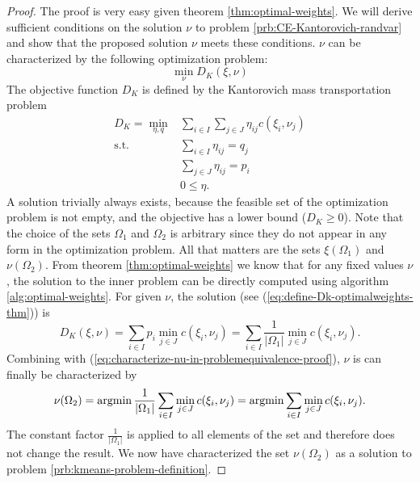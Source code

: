 \begin{proof}
  The proof is very easy given theorem \ref{thm:optimal-weights}. 
  We will derive sufficient conditions on the solution $\nu$ to problem \ref{prb:CE-Kantorovich-randvar} and show that the proposed solution $\nu$ meets these conditions.
  $\nu$ can be characterized by the following optimization problem:
  \begin{equation}
    \label{eq:characterize-nu-in-problemequivalence-proof}
    \min\limits_{\nu}D_K(\xi,\nu)
  \end{equation}
  The objective function $D_K$ is defined by the Kantorovich mass transportation problem
  \begin{align}
    \label{eq:kantoro-in-problemequivalence-proof}
    D_K = \min\limits_{\eta, q}& \sum_{i\in I}\sum_{j\in J}\eta_{ij}c(\xi_i,\nu_j)\\
    \text{s.t.}&\sum_{i\in I}\eta_{ij} = q_j\\
    &\sum_{j\in J}\eta_{ij} = p_i\\
    &0\leq \eta.
  \end{align}
  A solution trivially always exists, because the feasible set of the optimization problem is not empty, and the objective has a lower bound ($D_K\geq 0$).
  Note that the choice of the sets $\Omega_1$ and $\Omega_2$ is arbitrary since they do not appear in any form in the optimization problem.
  All that matters are the sets $\xi(\Omega_1)$ and $\nu(\Omega_2)$.
  From theorem \ref{thm:optimal-weights} we know that for any fixed values $\nu$, the solution to the inner problem can be directly computed using algorithm \ref{alg:optimal-weights}.
  For given $\nu$, the solution (see (\ref{eq:define-Dk-optimalweights-thm})) is
  \begin{equation}
    \label{eq:repeat-Dk-optimalweights-for-kmeansproof}
    D_K(\xi,\nu) = \sum_{i\in I}p_i\min\limits_{j\in J}c(\xi_i,\nu_j) = \sum_{i\in I}\frac{1}{|\Omega_1|}\min\limits_{j\in J}c(\xi_i,\nu_j). 
  \end{equation}
  Combining with (\ref{eq:characterize-nu-in-problemequivalence-proof}), $\nu$ is can finally be characterized by
  \begin{equation}
    \label{eq:end-of-kmeans-proof}
    \nu(\Omega_2) = \operatorname{argmin} \frac{1}{|\Omega_1|}\sum_{i\in I}\min\limits_{j\in J} c(\xi_i,\nu_j) = \operatorname{argmin} \sum_{i\in I}\min\limits_{j\in J} c(\xi_i,\nu_j).
  \end{equation}
  The constant factor $\frac{1}{|\Omega_1|}$ is applied to all elements of the set and therefore does not change the result.
  We now have characterized the set $\nu(\Omega_2)$ as a solution to problem \ref{prb:kmeans-problem-definition}.
\end{proof}
